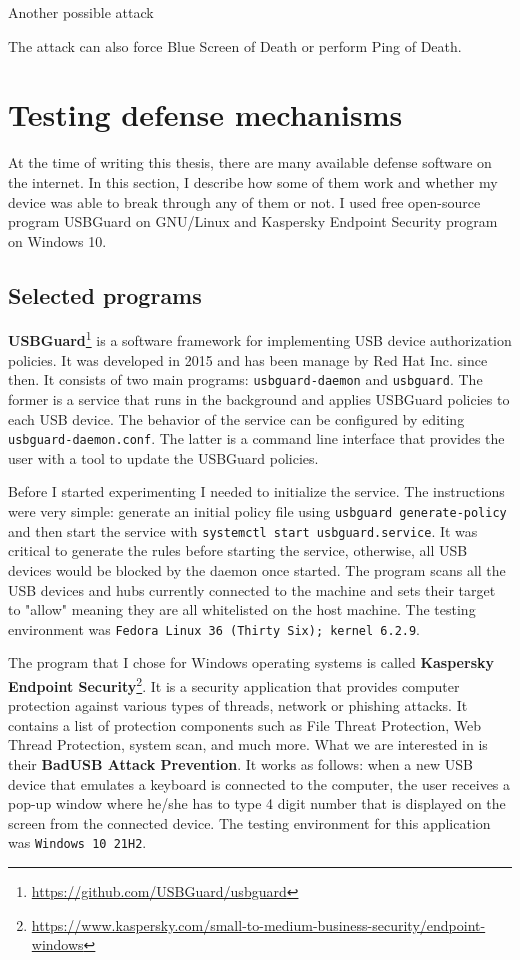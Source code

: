 Another possible attack 

The attack can also force Blue Screen of Death or perform Ping of Death.


\chapter{Testing defense mechanisms}
\label{defense}
At the time of writing this thesis, there are many available defense software on the internet. In this section, I describe how some of them work and whether my device was able to break through any of them or not. I used free open-source program USBGuard on GNU/Linux and Kaspersky Endpoint Security program on Windows 10.

\section{Selected programs}
\textbf{USBGuard}\footnote{\url{https://github.com/USBGuard/usbguard}} is a software framework for implementing USB device authorization policies. It was developed in 2015 and has been manage by Red Hat Inc. since then. It consists of two main programs: \verb|usbguard-daemon| and \verb|usbguard|. The former is a service that runs in the background and applies USBGuard policies to each USB device. The behavior of the service can be configured by editing \verb|usbguard-daemon.conf|. The latter is a command line interface that provides the user with a tool to update the USBGuard policies.

Before I started experimenting I needed to initialize the service. The instructions were very simple: generate an initial policy file using \verb|usbguard generate-policy| and then start the service with \verb|systemctl start usbguard.service|. It was critical to generate the rules before starting the service, otherwise, all USB devices would be blocked by the daemon once started. The program scans all the USB devices and hubs currently connected to the machine and sets their target to "allow" meaning they are all whitelisted on the host machine. The testing environment was \verb|Fedora Linux 36 (Thirty Six); kernel 6.2.9|.

The program that I chose for Windows operating systems is called \textbf{Kaspersky Endpoint Security}\footnote{\url{https://www.kaspersky.com/small-to-medium-business-security/endpoint-windows}}. It is a security application that provides computer protection against various types of threads, network or phishing attacks. It contains a list of protection components such as File Threat Protection, Web Thread Protection, system scan, and much more. What we are interested in is their \textbf{BadUSB Attack Prevention}. It works as follows: when a new USB device that emulates a keyboard is connected to the computer, the user receives a pop-up window where he/she has to type 4 digit number that is displayed on the screen from the connected device. The testing environment for this application was \verb|Windows 10 21H2|.

